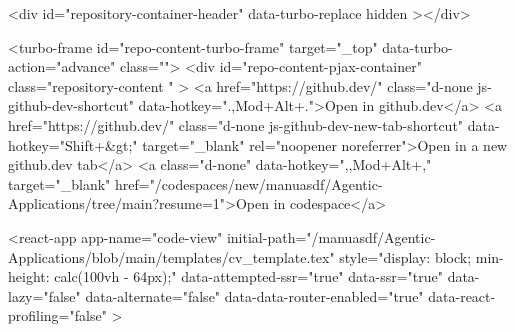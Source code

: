 {{    
  <div id="repository-container-header" data-turbo-replace hidden ></div>



<turbo-frame id="repo-content-turbo-frame" target="_top" data-turbo-action="advance" class="">
    <div id="repo-content-pjax-container" class="repository-content " >
      <a href="https://github.dev/" class="d-none js-github-dev-shortcut" data-hotkey=".,Mod+Alt+.">Open in github.dev</a>
  <a href="https://github.dev/" class="d-none js-github-dev-new-tab-shortcut" data-hotkey="Shift+&gt;" target="_blank" rel="noopener noreferrer">Open in a new github.dev tab</a>
    <a class="d-none" data-hotkey=",,Mod+Alt+," target="_blank" href="/codespaces/new/manuasdf/Agentic-Applications/tree/main?resume=1">Open in codespace</a>




    
      
    








<react-app
  app-name="code-view"
  initial-path="/manuasdf/Agentic-Applications/blob/main/templates/cv_template.tex"
  style="display: block; min-height: calc(100vh - 64px);"
  data-attempted-ssr="true"
  data-ssr="true"
  data-lazy="false"
  data-alternate="false"
  data-data-router-enabled="true"
  data-react-profiling="false"
>
  
}}
